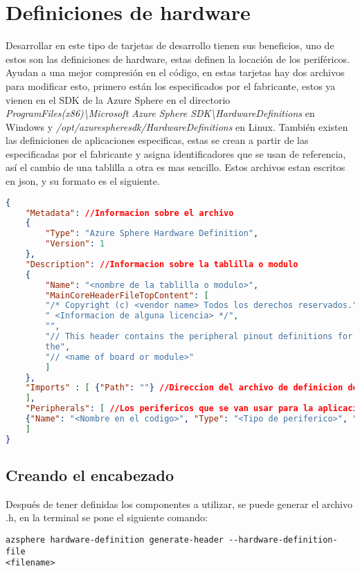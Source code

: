 \section{Definiciones de hardware}
Desarrollar en este tipo de tarjetas de desarrollo tienen sus beneficios, uno de estos son las definiciones de hardware, estas definen la locación de los periféricos. Ayudan a una mejor compresión en el código, en estas tarjetas hay dos archivos para modificar esto, primero están los especificados por el fabricante, estos ya vienen en el SDK de la Azure Sphere en el directorio \textit{ProgramFiles(x86)\textbackslash Microsoft Azure Sphere SDK\textbackslash HardwareDefinitions} en Windows y \textit{/opt/azurespheresdk/HardwareDefinitions} en Linux. También existen las definiciones de aplicaciones especificas, estas se crean a partir de las especificadas por el fabricante y asigna identificadores que se usan de referencia, así el cambio de una tablilla a otra es mas sencillo.
Estos archivos estan escritos en json, y su formato es el siguiente.
\begin{lstlisting}[language = json, firstnumber=1]
{
	"Metadata": //Informacion sobre el archivo
	{
		"Type": "Azure Sphere Hardware Definition",
		"Version": 1
	},
	"Description": //Informacion sobre la tablilla o modulo
	{
		"Name": "<nombre de la tablilla o modulo>",
		"MainCoreHeaderFileTopContent": [
		"/* Copyright (c) <vendor name> Todos los derechos reservados.",
		" <Informacion de alguna licencia> */",
		"",
		"// This header contains the peripheral pinout definitions for
		the",
		"// <name of board or module>"
		]
	},
	"Imports" : [ {"Path": ""} //Direccion del archivo de definicion de hardware para definir sobre ella
	],
	"Peripherals": [ //Los perifericos que se van usar para la aplicacion
	{"Name": "<Nombre en el codigo>", "Type": "<Tipo de periferico>", "Mapping": "<El nombre del periferico en el archivo importado>", "Comment": "<Informacion a destacar>"},
	]
}
\end{lstlisting}

\subsection{Creando el encabezado}
Después de tener definidas los componentes a utilizar, se puede generar el archivo .h, en la terminal se pone el siguiente comando:
\begin{verbatim}
azsphere hardware-definition generate-header --hardware-definition-file
<filename> 
\end{verbatim}

